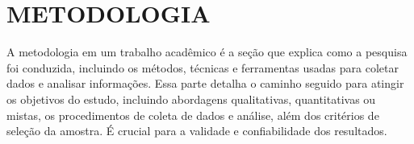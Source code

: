 

\section{\textbf{METODOLOGIA}}
    \label{cha:metodologia}

    A metodologia em um trabalho acadêmico é a seção que explica como a pesquisa foi conduzida, incluindo os métodos, técnicas e ferramentas usadas para coletar dados e analisar informações. Essa parte detalha o caminho seguido para atingir os objetivos do estudo, incluindo abordagens qualitativas, quantitativas ou mistas, os procedimentos de coleta de dados e análise, além dos critérios de seleção da amostra. É crucial para a validade e confiabilidade dos resultados.
    
    
    
    
    
    

\newpage
